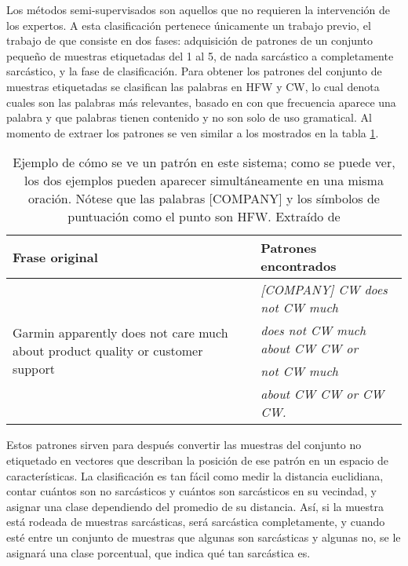 \par Los métodos semi-supervisados son aquellos que no requieren la intervención de los expertos. A esta clasificación pertenece únicamente un trabajo previo, el trabajo de \textcite{davidov2010semi} que consiste en dos fases: adquisición de patrones de un conjunto pequeño de muestras etiquetadas del 1 al 5, de nada sarcástico a completamente sarcástico,  y la fase de clasificación. Para obtener los patrones del conjunto de muestras etiquetadas se clasifican las palabras en \gls{HFW} y \gls{CW}, lo cual denota cuales son las palabras más relevantes, basado en con que frecuencia aparece una palabra y que palabras tienen contenido y no son solo de uso gramatical. Al momento de extraer los patrones se ven similar a los mostrados en la tabla \ref{tab:ejemplo}.
\begin{center}
	\begin{table}[h]
		\caption{\footnotesize{Ejemplo de cómo se ve un patrón en este sistema; como se puede ver, los dos ejemplos pueden aparecer simultáneamente en una misma oración. Nótese que las palabras [COMPANY] y los símbolos de puntuación como el punto son \gls{HFW}. Extraído de \textcite{davidov2010semi}}}
		\label{tab:ejemplo}
		\begin{tabular}{|p{6.5cm}|p{7cm}|}
			\hline
			Frase original & Patrones encontrados                              \\
			\hline
			\multirow{4}{6cm}{Garmin apparently does not care much about product quality or customer support}
			               & \tabitem \textit{[COMPANY] CW does not CW much}   \\
			               & \tabitem \textit{does not CW much about CW CW or} \\
			               & \tabitem \textit{not CW much}                     \\
			               & \tabitem \textit{about CW CW or CW CW.}           \\
			\hline
		\end{tabular}
	\end{table}
\end{center}
\par Estos patrones sirven para después convertir las muestras del conjunto no etiquetado en vectores que describan la posición de ese patrón en un espacio de características. La clasificación es tan fácil como medir la distancia euclidiana, contar cuántos son no sarcásticos y cuántos son sarcásticos en su vecindad, y asignar una clase dependiendo del promedio de su distancia. Así, si la muestra está rodeada de muestras sarcásticas, será sarcástica completamente, y cuando esté entre un conjunto de muestras que algunas son sarcásticas y algunas no, se le asignará una clase porcentual, que indica qué tan sarcástica es.

